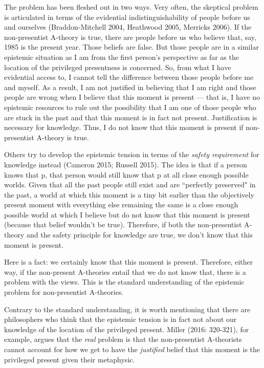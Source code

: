 \documentclass[a4paper,12pt]{article}
\begin{document}
The problem has been fleshed out in two ways. Very often, the skeptical problem is articulated in terms of the evidential indistinguishability of people before us and ourselves (Braddon-Mitchell 2004, Heathwood 2005, Merricks 2006). If the non-presentist A-theory is true, there are people before us who believe that, say, 1985 is the present year. Those beliefs are false. But those people are in a similar epistemic situation as I am from the first person's perspective as far as the location of the privileged presentness is concerned. So, from what I have evidential access to, I cannot tell the difference between those people before me and myself. As a result, I am not justified in believing that I am right and those people are wrong when I believe that this moment is present --- that is, I have no epistemic resources to rule out the possibility that I am one of those people who are stuck in the past and that this moment is in fact not present. Justification is necessary for knowledge. Thus, I do not know that this moment is present if non-presentist A-theory is true.

Others try to develop the epistemic tension in terms of the \emph{safety requirement} for knowledge instead (Cameron 2015; Russell 2015). The idea is that if a person knows that p, that person would still know that p at all close enough possible worlds. Given that all the past people still exist and are ``perfectly preserved" in the past, a world at which this moment is a tiny bit earlier than the objectively present moment with everything else remaining the same is a close enough possible world at which I believe but do not know that this moment is present (because that belief wouldn't be true). Therefore, if both the non-presentist A-theory and the safety principle for knowledge are true, we don't know that this moment is present.

Here is a fact: we certainly know that this moment is present. Therefore, either way, if the non-present A-theories entail that we do not know that, there is a problem with the views. This is the standard understanding of the epistemic problem for non-presentist A-theories.

Contrary to the standard understanding, it is worth mentioning that there are philosophers who think that the epistemic tension is in fact not about our knowledge of the location of the privileged present. Miller (2016: 320-321), for example, argues that the \emph{real} problem is that the non-presentist A-theorists cannot account for how we get to have the \emph{justified} belief that this moment is the privileged present given their metaphysic.
\end{document}
